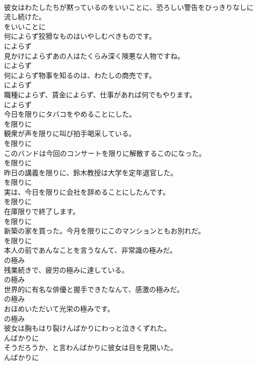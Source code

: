 \documentclass[8pt]{extreport}
\begin{document}
\begin{CJK}{UTF8}{min}
\\	彼女はわたしたちが黙っているのをいいことに、恐ろしい警告をひっきりなしに流し続けた。	
\\	をいいことに
\\	何によらず狡猾なものはいやしむべきものです。	
\\	によらず
\\	見かけによらずあの人はたくらみ深く険悪な人物ですね。	
\\	によらず
\\	何によらず物事を知るのは、わたしの商売です。	
\\	によらず
\\	職種によらず、賃金によらず、仕事があれば何でもやります。	
\\	によらず
\\	今日を限りにタバコをやめることにした。	
\\	を限りに
\\	観衆が声を限りに叫び拍手喝采している。	
\\	を限りに
\\	このバンドは今回のコンサートを限りに解散するこのになった。	
\\	を限りに
\\	昨日の講義を限りに、鈴木教授は大学を定年退官した。	
\\	を限りに
\\	実は、今日を限りに会社を辞めることにしたんです。	
\\	を限りに
\\	在庫限りで終了します。	
\\	を限りに
\\	新築の家を買った。今月を限りにこのマンションともお別れだ。	
\\	を限りに
\\	本人の前であんなことを言うなんて、非常識の極みだ。	
\\	の極み
\\	残業続きで、疲労の極みに達している。	
\\	の極み
\\	世界的に有名な俳優と握手できたなんて、感激の極みだ。	
\\	の極み
\\	おほめいただいて光栄の極みです。	
\\	の極み
\\	彼女は胸もはり裂けんばかりにわっと泣きくずれた。	
\\	んばかりに
\\	そうだろうか、と言わんばかりに彼女は目を見開いた。	
\\	んばかりに

\end{CJK}
\end{document}
